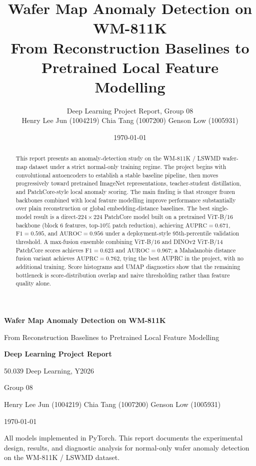 \documentclass[11pt]{article}
\title{%
  \textbf{Wafer Map Anomaly Detection on WM-811K}\\[0.4em]
  \large From Reconstruction Baselines to Pretrained Local Feature Modelling
}
\author{Deep Learning Project Report, Group 08\\[0.3em]
  Henry Lee Jun (1004219) \quad Chia Tang (1007200) \quad Genson Low (1005931)}
\date{\today}
\begin{document}
\begin{titlepage}
  \centering
  \vspace*{2cm}
  {\LARGE\bfseries Wafer Map Anomaly Detection on WM-811K\par}
  \vspace{0.5cm}
  {\large From Reconstruction Baselines to Pretrained Local Feature Modelling\par}
  \vspace{1.5cm}
  {\large\bfseries Deep Learning Project Report\par}
  \vspace{0.4cm}
  {\large 50.039 Deep Learning, Y2026\par}
  \vspace{0.4cm}
  {\large Group 08\par}
  \vspace{0.6cm}
  {\normalsize
    Henry Lee Jun (1004219) \quad
    Chia Tang (1007200) \quad
    Genson Low (1005931)\par}
  \vspace{0.8cm}

  {\large \today\par}
  \vfill
  {\small All models implemented in PyTorch. This report documents the experimental design,
  results, and diagnostic analysis for normal-only wafer anomaly detection on the
  WM-811K / LSWMD dataset.\par}
\end{titlepage}


\begin{abstract}
This report presents an anomaly-detection study on the WM-811K / LSWMD wafer-map dataset
under a strict normal-only training regime. The project begins with convolutional autoencoders
to establish a stable baseline pipeline, then moves progressively toward pretrained
ImageNet representations, teacher-student distillation, and PatchCore-style local anomaly
scoring. The main finding is that stronger frozen backbones combined with local feature
modelling improve performance substantially over plain reconstruction or global
embedding-distance baselines. The best single-model result is a
direct-$224\!\times\!224$ PatchCore model built on a pretrained ViT-B/16 backbone
(block 6 features, top-10\% patch reduction), achieving $\mathrm{AUPRC}=0.671$,
$\mathrm{F1}=0.595$, and $\mathrm{AUROC}=0.956$ under a deployment-style
95th-percentile validation threshold. A max-fusion ensemble combining ViT-B/16 and
DINOv2 ViT-B/14 PatchCore scores achieves $\mathrm{F1}=0.623$ and $\mathrm{AUROC}=0.967$;
a Mahalanobis distance fusion variant achieves $\mathrm{AUPRC}=0.762$, tying
the best AUPRC in the project, with no additional training.
Score histograms and UMAP diagnostics show that the remaining bottleneck is
score-distribution overlap and naive thresholding rather than feature quality alone.
\end{abstract}
\end{document}
